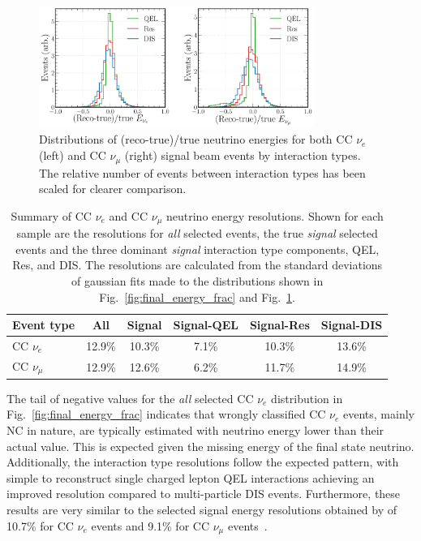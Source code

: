 \begin{figure} %
    \includegraphics[width=0.8\textwidth]{diagrams/6-cvn/chipsnet/final_energy_frac_split.pdf}
    \caption[Distributions of (reco-true)/true neutrino energies by interaction type.]
    {Distributions of (reco-true)/true neutrino energies for both CC $\nu_{e}$ (left) and CC
        $\nu_{\mu}$ (right) signal beam events by interaction types. The relative number of events
        between interaction types has been scaled for clearer comparison.}
    \label{fig:final_energy_frac_split}
\end{figure}

\begin{table}
    \begin{tabular}{lccccc}
        Event type     & All    & Signal & Signal-QEL & Signal-Res & Signal-DIS \\
        \midrule
        CC $\nu_{e}$   & 12.9\% & 10.3\% & 7.1\%      & 10.3\%     & 13.6\%     \\
        CC $\nu_{\mu}$ & 12.9\% & 12.6\% & 6.2\%      & 11.7\%     & 14.9\%     \\
    \end{tabular}
    \caption[Summary of CC $\nu_{e}$ and CC $\nu_{\mu}$ neutrino energy resolutions]
    {Summary of CC $\nu_{e}$ and CC $\nu_{\mu}$ neutrino energy resolutions. Shown for each sample
        are the resolutions for \emph{all} selected events, the true \emph{signal} selected events
        and the three dominant \emph{signal} interaction type components, QEL, Res, and DIS. The
        resolutions are calculated from the standard deviations of gaussian fits made to the
        distributions shown in Fig.~\ref{fig:final_energy_frac} and
        Fig.~\ref{fig:final_energy_frac_split}.}
    \label{tab:energy_resolutions}
\end{table}

The tail of negative values for the \emph{all} selected CC $\nu_{e}$ distribution in
Fig.~\ref{fig:final_energy_frac} indicates that wrongly classified CC $\nu_{e}$ events, mainly NC
in nature, are typically estimated with neutrino energy lower than their actual value. This is
expected given the missing energy of the final state neutrino. Additionally, the interaction type
resolutions follow the expected pattern, with simple to reconstruct single charged lepton QEL
interactions achieving an improved resolution compared to multi-particle DIS events. Furthermore,
these results are very similar to the selected signal energy resolutions obtained by \nova of
10.7\% for CC $\nu_{e}$ events and 9.1\% for CC $\nu_{\mu}$ events~\cite{acero2019}.


